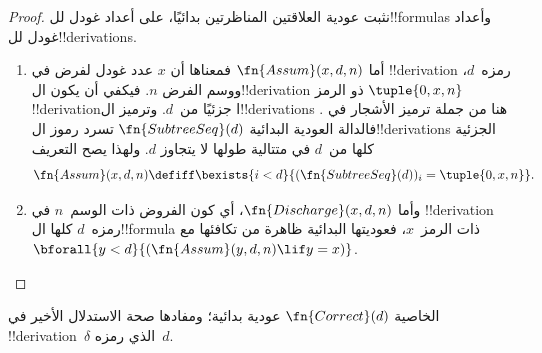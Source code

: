 \documentclass[../../../include/open-logic-section]{subfiles}
\begin{document}
\begin{proof}
  نثبت عودية العلاقتين المناظرتين بدائيًا، على أعداد
  غودل لل!!{formula}s وأعداد غودل لل!!{derivation}s.
  \begin{enumerate}
  \item أما $\fn{Assum}(x,d,n)$ فمعناها أن $x$
    عدد غودل لفرض في !!{derivation} رمزه~$d$،
    ووسم الفرض $n$. فيكفي أن يكون ال!!{derivation}
    ذو الرمز $\tuple{0,x,n}$ !!{derivation}ًا جزئيًا
    من~$d$. وترميز ال!!{derivation}s هنا من جملة
    ترميز الأشجار في .
    فالدالة العودية البدائية $\fn{SubtreeSeq}(d)$
    تسرد رموز ال!!{derivation}s الجزئية كلها
    من~$d$ في متتالية طولها لا يتجاوز $d$.
    ولهذا يصح التعريف
    \[
    \fn{Assum}(x, d, n) \defiff \bexists{i<d}{(\fn{SubtreeSeq}(d))_i =
      \tuple{0, x, n}}.
    \]
  \item وأما $\fn{Discharge}(x,d,n)$، أي كون
    الفروض ذات الوسم~$n$ في !!{derivation} رمزه~$d$
    كلها ال!!{formula} ذات الرمز~$x$، فعوديتها
    البدائية ظاهرة من تكافئها مع
    $\bforall{y<d}{(\fn{Assum}(y,d,n) \lif y=x)}$.
  \end{enumerate}
\end{proof}

\begin{prop}
  الخاصية $\fn{Correct}(d)$ عودية بدائية؛ ومفادها صحة
  الاستدلال الأخير في !!{derivation}~$\delta$ الذي رمزه~$d$.
\end{prop}
\end{document}
